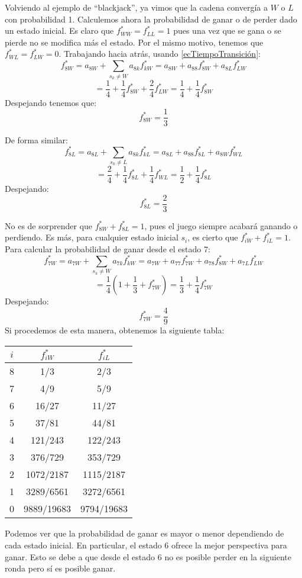 \begin{exampleth}
Volviendo al ejemplo de \enquote{blackjack}, ya vimos que la cadena convergía a $W$ o $L$ con probabilidad 1. Calculemos ahora la probabilidad de ganar o de perder dado un estado inicial. Es claro que $f_{WW}^*=f_{LL}^*=1$ pues una vez que se gana o se pierde no se modifica más el estado. Por el mismo motivo, tenemos que $f_{WL}^*=f_{LW}^*=0$. Trabajando hacia atrás, usando \ref{ecTiempoTransición}:
\[f_{8W}^*=a_{8W}+\sum_{s_k\neq W}a_{8k}f_{kW}^*=a_{8W}+a_{88}f_{8W}^*+a_{8L}f_{LW}^*\]
\[=\dfrac{1}{4}+\dfrac{1}{4}f_{8W}^*+\dfrac{2}{4}f_{LW}^*=\dfrac{1}{4}+\dfrac{1}{4}f_{8W}^*\]
Despejando tenemos que:
\[f_{8W}^*=\dfrac{1}{3}\]

De forma similar:
\[f_{8L}^*=a_{8L}+\sum_{s_k\neq L}a_{8k}f_{kL}^*=a_{8L}+a_{88}f_{8L}^*+a_{8W}f_{WL}^*\]
\[=\dfrac{2}{4}+\dfrac{1}{4}f_{8L}^*+\dfrac{1}{4}f_{WL}^*=\dfrac{1}{2}+\dfrac{1}{4}f_{8L}^*\]
Despejando:
\[f_{8L}^*=\dfrac{2}{3}\]

No es de sorprender que $f_{8W}^*+f_{8L}^*=1$, pues el juego siempre acabará ganando o perdiendo. Es más, para cualquier estado inicial $s_i$, es cierto que $f_{iW}^*+f_{iL}^*=1$. Para calcular la probabilidad de ganar desde el estado 7:
\[f_{7W}^*=a_{7W}+\sum_{s_k\neq W}a_{7k}f_{kW}^*=a_{7W}+a_{77}f_{7W}^*+a_{78}f_{8W}^*+a_{7L}f_{LW}^*\]
\[=\dfrac{1}{4}\left(1+\dfrac{1}{3}+f_{7W}^*\right)=\dfrac{1}{3}+\dfrac{1}{4}f_{7W}^*\]
Despejando:
\[f_{7W}^*=\dfrac{4}{9}\]
Si procedemos de esta manera, obtenemos la siguiente tabla:
\begin{center}
    \begin{tabular}{|c|c|c|}
        \hline
        $i$ & $f_{iW}^*$ & $f_{iL}^*$  \\
        \hline   
        8 & 1/3 & 2/3 \\
        \hline
        7 & 4/9 & 5/9 \\
        \hline
        6 & 16/27 & 11/27\\
        \hline
        5 & 37/81 & 44/81 \\
        \hline
        4 & 121/243 & 122/243\\
        \hline
        3 & 376/729 & 353/729\\
        \hline
        2 & 1072/2187 & 1115/2187\\
        \hline
        1 & 3289/6561 & 3272/6561\\
        \hline
        0 & 9889/19683 & 9794/19683\\
        \hline
    \end{tabular}
\end{center}    
Podemos ver que la probabilidad de ganar es mayor o menor dependiendo de cada estado inicial. En particular, el estado 6 ofrece la mejor perspectiva para ganar. Esto se debe a que desde el estado 6 no es posible perder en la siguiente ronda pero sí es posible ganar.
\end{exampleth}

